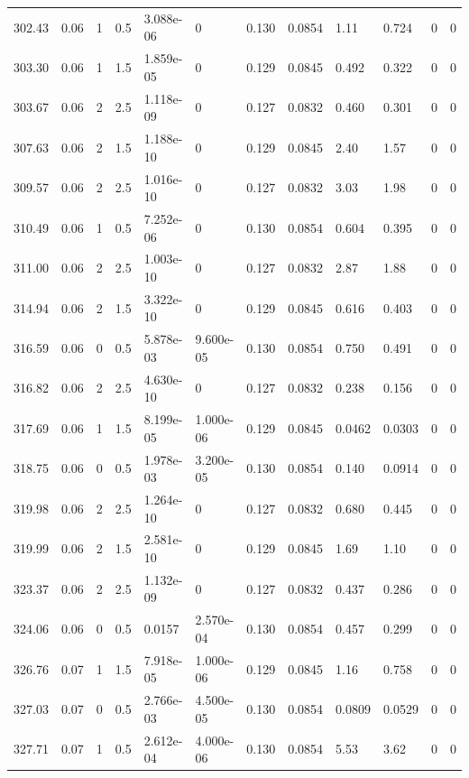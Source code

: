 \documentclass[preview]{standalone}
\begin{document}
{{{{{\begin{tabular}{L{1.2cm}C{1.2cm} C{0.3cm}C{0.5cm} C{1.4cm}C{1.4cm} C{1.4cm}C{1.4cm} C{1.6cm}C{1.6cm} C{1.6cm}C{1.6cm}}
  302.43  &  0.06  & 1     & 0.5 &  3.088e-06  & 0  &  0.130&   0.0854& 1.11 & 0.724   &  0 & 0  \\ 
  303.30  &  0.06  & 1     & 1.5 &  1.859e-05  & 0  &  0.129&   0.0845& 0.492 & 0.322   &  0 & 0  \\ 
  303.67  &  0.06  & 2     & 2.5 &  1.118e-09  & 0  &  0.127&   0.0832& 0.460 & 0.301   &  0 & 0  \\ 
  307.63  &  0.06  & 2     & 1.5 &  1.188e-10  & 0  &  0.129&   0.0845& 2.40 & 1.57   &  0 & 0  \\ 
  309.57  &  0.06  & 2     & 2.5 &  1.016e-10  & 0  &  0.127&   0.0832& 3.03 & 1.98   &  0 & 0  \\ 
  310.49  &  0.06  & 1     & 0.5 &  7.252e-06  & 0  &  0.130&   0.0854& 0.604 & 0.395   &  0 & 0  \\ 
  311.00  &  0.06  & 2     & 2.5 &  1.003e-10  & 0  &  0.127&   0.0832& 2.87 & 1.88   &  0 & 0  \\ 
  314.94  &  0.06  & 2     & 1.5 &  3.322e-10  & 0  &  0.129&   0.0845& 0.616 & 0.403   &  0 & 0  \\ 
  316.59  &  0.06  & 0     & 0.5 &  5.878e-03  & 9.600e-05  &  0.130&   0.0854& 0.750 & 0.491   &  0 & 0  \\ 
  316.82  &  0.06  & 2     & 2.5 &  4.630e-10  & 0  &  0.127&   0.0832& 0.238 & 0.156   &  0 & 0  \\ 
  317.69  &  0.06  & 1     & 1.5 &  8.199e-05  & 1.000e-06  &  0.129&   0.0845& 0.0462 & 0.0303   &  0 & 0  \\ 
  318.75  &  0.06  & 0     & 0.5 &  1.978e-03  & 3.200e-05  &  0.130&   0.0854& 0.140 & 0.0914   &  0 & 0  \\ 
  319.98  &  0.06  & 2     & 2.5 &  1.264e-10  & 0  &  0.127&   0.0832& 0.680 & 0.445   &  0 & 0  \\ 
  319.99  &  0.06  & 2     & 1.5 &  2.581e-10  & 0  &  0.129&   0.0845& 1.69 & 1.10   &  0 & 0  \\ 
  323.37  &  0.06  & 2     & 2.5 &  1.132e-09  & 0  &  0.127&   0.0832& 0.437 & 0.286   &  0 & 0  \\ 
  324.06  &  0.06  & 0     & 0.5 &  0.0157  & 2.570e-04  &  0.130&   0.0854& 0.457 & 0.299   &  0 & 0  \\ 
  326.76  &  0.07  & 1     & 1.5 &  7.918e-05  & 1.000e-06  &  0.129&   0.0845& 1.16 & 0.758   &  0 & 0  \\ 
  327.03  &  0.07  & 0     & 0.5 &  2.766e-03  & 4.500e-05  &  0.130&   0.0854& 0.0809 & 0.0529   &  0 & 0  \\ 
  327.71  &  0.07  & 1     & 0.5 &  2.612e-04  & 4.000e-06  &  0.130&   0.0854& 5.53 & 3.62   &  0 & 0  \\ 

\end{tabular}}}}}}
\end{document}
